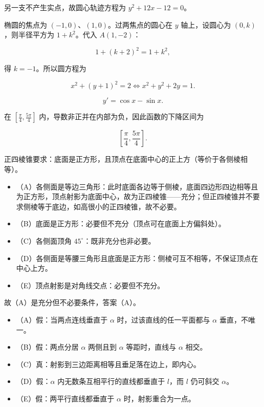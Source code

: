 \begin{answer}
另一支不产生实点，故圆心轨迹方程为 $y^2+12x-12=0$。


椭圆的焦点为 $(-1,0)$、$(1,0)$。过两焦点的圆心在 $y$ 轴上，设圆心为 $(0,k)$，则半径平方为 $1+k^2$。代入 $A(1,-2)$：

\nopagebreak[4]
\[
1+(k+2)^2=1+k^2,
\]

得 $k=-1$。所以圆方程为

\nopagebreak[4]
\[
x^2+(y+1)^2=2
\Longleftrightarrow
x^2+y^2+2y=1.
\]


\nopagebreak[4]
\[
y'=\cos x-\sin x.
\]

在 $[\frac\pi4,\frac{5\pi}4]$ 内，导数非正并在内部为负，因此函数的下降区间为

\nopagebreak[4]
\[
\left[\frac\pi4,\frac{5\pi}4\right].
\]


正四棱锥要求：底面是正方形，且顶点在底面中心的正上方（等价于各侧棱相等）。

\begin{itemize}
\item （A）各侧面是等边三角形：此时底面各边等于侧棱，底面四边形四边相等且为正方形，顶点射影为底面中心，故为正四棱锥——充分；但正四棱锥并不要求侧棱等于底边，如高很小的正四棱锥，故不必要。
\item （B）底面是正方形：必要但不充分（顶点可在底面上方偏斜处）。
\item （C）各侧面顶角 $45^\circ$：既非充分也非必要。
\item （D）各侧面是等腰三角形且底面是正方形：侧棱可互不相等，不保证顶点在中心上方。
\item （E）顶点射影是对角线交点：必要但不充分。
\end{itemize}

故（A）是充分但不必要条件，答案（A）。


\begin{itemize}
\item （A）假：当两点连线垂直于 $\alpha$ 时，过该直线的任一平面都与 $\alpha$ 垂直，不唯一。
\item （B）假：两点分居 $\alpha$ 两侧且到 $\alpha$ 等距时，直线与 $\alpha$ 相交。
\item （C）真：射影到三边距离相等且垂足落在边上，即内心。
\item （D）假：$\alpha$ 内无数条互相平行的直线都垂直于 $l$，而 $l$ 仍可斜交 $\alpha$。
\item （E）假：两平行直线都垂直于 $\alpha$ 时，射影重合为一点。
\end{itemize}


\end{answer}
